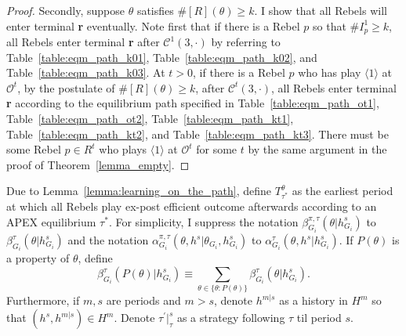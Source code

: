 \documentclass[12pt,letter]{article}
\newcommand{\Kappa}{\mathcal{C}}
\newcommand{\Omicron}{\mathcal{O}}
\theoremstyle{definition}
\theoremstyle{remark}
\theoremstyle{claim}
\begin{document}
\begin{proof}
Secondly, suppose $\theta$ satisfies $\#[R](\theta)\geq k$. I show that all Rebels will enter terminal \textbf{r} eventually. Note first that if there is a Rebel $p$ so that $\#I^1_p\geq k$, all Rebels enter terminal \textbf{r} after $\Kappa^1(3,\cdot)$ by referring to Table~\ref{table:eqm_path_k01}, Table~\ref{table:eqm_path_k02}, and Table~\ref{table:eqm_path_k03}. At $t>0$, if there is a Rebel $p$ who has play $\langle 1 \rangle$ at $\Omicron^t$, by the postulate of $\#[R](\theta)\geq k$, after $\Kappa^t(3,\cdot)$, all Rebels enter terminal \textbf{r} according to the equilibrium path specified in Table~\ref{table:eqm_path_ot1}, Table~\ref{table:eqm_path_ot2}, Table~\ref{table:eqm_path_kt1}, Table~\ref{table:eqm_path_kt2}, and Table~\ref{table:eqm_path_kt3}. There must be some Rebel $p\in R^t$ who plays $\langle 1 \rangle$ at $\Omicron^t$ for some $t$ by the same argument in the proof of Theorem~\ref{lemma_empty}.
\end{proof}


Due to Lemma~\ref{lemma:learning_on_the_path}, define $T^{\theta}_{\tau^{*}}$ as the earliest period at which all Rebels play ex-post efficient outcome afterwards according to an APEX equilibrium $\tau^{*}$.  For simplicity, I suppress the notation $\beta^{\pi,\tau}_{G_i}(\theta|h^s_{G_i})$ to $\beta^{\tau}_{G_i}(\theta|h^s_{G_i})$ and the notation $\alpha^{\pi,\tau}_{G_i}(\theta, h^{s}|\theta_{G_i},h^{s}_{G_i})$ to $\alpha^{\tau}_{G_i}(\theta, h^{s}|h^{s}_{G_i})$. If $P(\theta)$ is a property of $\theta$, define \[\beta^{\tau}_{G_i}(P(\theta)|h^s_{G_i})\equiv \sum_{\theta\in\{\theta:P(\theta)\}}\beta^{\tau}_{G_i}(\theta|h^s_{G_i}).\] Furthermore, if $m,s$ are periods and $m>s$, denote $h^{m|s}$ as a history in $H^m$ so that $(h^s,h^{m|s})\in H^m$. Denote $\tau^{'}|^s_{\tau}$ as a strategy following $\tau$ til period $s$.
\end{document}
